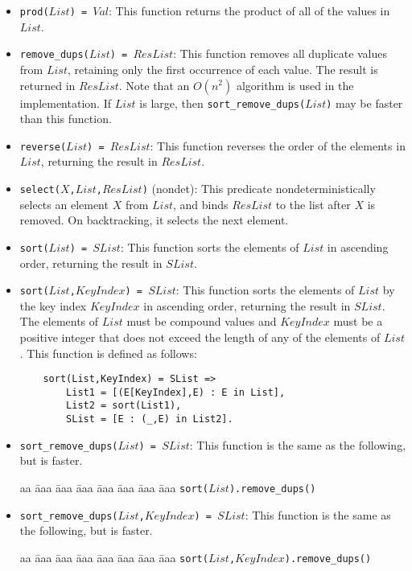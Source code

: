 \begin{itemize}
\item \texttt{prod($List$) = $Val$}: This function returns the product of all of the values in $List$. 
\item \texttt{remove\_dups($List$) = $ResList$}: This function removes all duplicate values from $List$, retaining only the first occurrence of each value.  The result is returned in $ResList$. Note that an $O(n^2)$ algorithm is used in the implementation. If $List$ is large, then \texttt{sort\_remove\_dups($List$)} may be faster than this function.
\item \texttt{reverse($List$) = $ResList$}: This function reverses the order of the elements in $List$, returning the result in $ResList$. 
\item \texttt{select($X$,$List$,$ResList$)} (nondet): This predicate nondeterministically selects an element $X$ from $List$, and binds $ResList$ to the list after $X$ is removed. On backtracking, it selects the next element.
\item \texttt{sort($List$) = $SList$}: This function sorts the elements of $List$ in ascending order, returning the result in $SList$. 
\item \texttt{sort($List$,$KeyIndex$) = $SList$}: This function sorts the elements of $List$ by the key index $KeyIndex$ in ascending order, returning the result in $SList$. The elements of $List$ must be compound values and $KeyIndex$ must be a positive integer that does not exceed the length of any of the elements of $List$. This function is defined as follows:
\begin{verbatim}
    sort(List,KeyIndex) = SList =>
        List1 = [(E[KeyIndex],E) : E in List],
        List2 = sort(List1),
        SList = [E : (_,E) in List2].
\end{verbatim}

\item \texttt{sort\_remove\_dups($List$) = $SList$}: This function is the same as the following, but is faster.
\begin{tabbing}
aa \= aaa \= aaa \= aaa \=aaa \= aaa \= aaa \= aaa \kill
\> \texttt{sort($List$).remove\_dups()}
\end{tabbing}

\item \texttt{sort\_remove\_dups($List$,$KeyIndex$) = $SList$}: This function is the same as the following, but is faster.
\begin{tabbing}
aa \= aaa \= aaa \= aaa \=aaa \= aaa \= aaa \= aaa \kill
\> \texttt{sort($List$,$KeyIndex$).remove\_dups()}
\end{tabbing}


\end{itemize}
